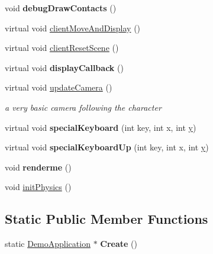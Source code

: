 \begin{DoxyCompactItemize}
\item 
\hypertarget{class_character_demo_a793e527a6b57b43b1b6cf30451416324}{void {\bfseries debug\+Draw\+Contacts} ()}\label{class_character_demo_a793e527a6b57b43b1b6cf30451416324}

\item 
virtual void \hyperlink{class_character_demo_a42f37ad732747d46449cb384f17b19e0}{client\+Move\+And\+Display} ()
\item 
virtual void \hyperlink{class_character_demo_a87a3accda91b2487741b7fb748d07ec4}{client\+Reset\+Scene} ()
\item 
\hypertarget{class_character_demo_a02d4834f73029e57ab0027b12e112680}{virtual void {\bfseries display\+Callback} ()}\label{class_character_demo_a02d4834f73029e57ab0027b12e112680}

\item 
\hypertarget{class_character_demo_ac7577aa794b1b951ff82c37eec2468bd}{virtual void \hyperlink{class_character_demo_ac7577aa794b1b951ff82c37eec2468bd}{update\+Camera} ()}\label{class_character_demo_ac7577aa794b1b951ff82c37eec2468bd}

\begin{DoxyCompactList}\small\item\em a very basic camera following the character \end{DoxyCompactList}\item 
\hypertarget{class_character_demo_a56fe0f7aef747b1306cbca4c0553742b}{virtual void {\bfseries special\+Keyboard} (int key, int x, int \hyperlink{_ice_utils_8h_aa7ffaed69623192258fb8679569ff9ba}{y})}\label{class_character_demo_a56fe0f7aef747b1306cbca4c0553742b}

\item 
\hypertarget{class_character_demo_ac344194def64e418cd881a76d8412abf}{virtual void {\bfseries special\+Keyboard\+Up} (int key, int x, int \hyperlink{_ice_utils_8h_aa7ffaed69623192258fb8679569ff9ba}{y})}\label{class_character_demo_ac344194def64e418cd881a76d8412abf}

\item 
\hypertarget{class_character_demo_a65a9bece235061806c91d79c9b0e9b88}{void {\bfseries renderme} ()}\label{class_character_demo_a65a9bece235061806c91d79c9b0e9b88}

\item 
void \hyperlink{class_character_demo_a1aa943283eeaa3d46a44d00d0d0161e7}{init\+Physics} ()
\end{DoxyCompactItemize}
\subsection*{Static Public Member Functions}
\begin{DoxyCompactItemize}
\item 
\hypertarget{class_character_demo_a69a5c0f7a8085ce70b94404d96354f32}{static \hyperlink{class_demo_application}{Demo\+Application} $\ast$ {\bfseries Create} ()}\label{class_character_demo_a69a5c0f7a8085ce70b94404d96354f32}

\end{DoxyCompactItemize}

